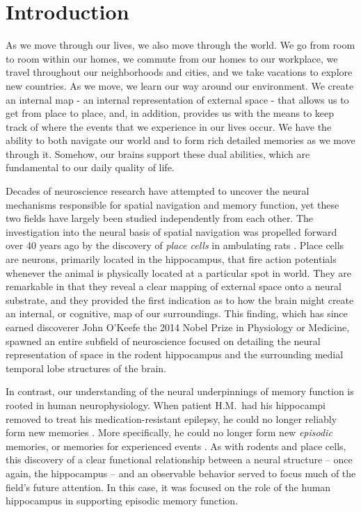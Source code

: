 \chapter{Introduction}

As we move through our lives, we also move through the world. We go from room to room within our homes, we commute from our homes to our workplace, we travel throughout our neighborhoods and cities, and we take vacations to explore new countries. As we move, we learn our way around our environment. We create an internal map - an internal representation of external space - that allows us to get from place to place, and, in addition, provides us with the means to keep track of where the events that we experience in our lives occur. We have the ability to both navigate our world and to form rich detailed memories as we move through it. Somehow, our brains support these dual abilities, which are fundamental to our daily quality of life.

Decades of neuroscience research have attempted to uncover the neural mechanisms responsible for spatial navigation and memory function, yet these two fields have largely been studied independently from each other. The investigation into the neural basis of spatial navigation was propelled forward over 40 years ago by the discovery of \textit{place cells} in ambulating rats \citep{OKeeDost71}. Place cells are neurons, primarily located in the hippocampus, that fire action potentials whenever the animal is physically located at a particular spot in world. They are remarkable in that they reveal a clear mapping of external space onto a neural substrate, and they provided the first indication as to how the brain might create an internal, or cognitive, map of our surroundings. This finding, which has since earned discoverer John O'Keefe the 2014 Nobel Prize in Physiology or Medicine, spawned an entire subfield of neuroscience focused on detailing the neural representation of space in the rodent hippocampus and the surrounding medial temporal lobe structures of the brain.

In contrast, our understanding of the neural underpinnings of memory function is rooted in human neurophysiology. When patient H.M.\ had his hippocampi removed to treat his medication-resistant epilepsy, he could no longer reliably form new memories \citep{ScovMiln57}. More specifically, he could no longer form new \textit{episodic} memories, or memories for experienced events \citep{Tulv72}. As with rodents and place cells, this discovery of a clear functional relationship between a neural structure -- once again, the hippocampus -- and an observable behavior served to focus much of the field's future attention. In this case, it was focused on the role of the human hippocampus in supporting episodic memory function.

